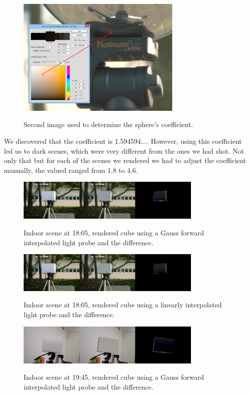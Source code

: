 \documentclass[conference]{acmsiggraph}
\begin{document}
	\begin{figure}[!ht]
		\centering
		\caption{Second image used to determine the sphere’s coefficient.}
		\includegraphics[width=8cm]{images/esf.png}
		\label{fig:esf}
	\end{figure}

	We discovered that the coefficient is 1.594594.... However, using this coefficient led us to dark scenes, which were very different from the ones we had shot. Not only that but for each of the scenes we rendered we had to adjust the coefficient manually, the valued ranged from 1.8 to 4.6.


	\begin{figure}[!ht]
		\caption{Indoor scene at 18:05, rendered cube using a Gauss forward interpolated light probe and the difference.}
		\centering
		\includegraphics[width=9cm]{images/extcubo1for.png}
		\label{fig:extcubo1for}
	\end{figure}

	\begin{figure}[!ht]
		\caption{Indoor scene at 18:05, rendered cube using a linearly interpolated light probe and the difference.}
		\centering
		\includegraphics[width=9cm]{images/extcubo1lin.png}
		\label{fig:extcubo1lin}
	\end{figure}

	\begin{figure}[!ht]
		\caption{Indoor scene at 19:45, rendered cube using a Gauss forward interpolated light probe and the difference.}
		\centering
		\includegraphics[width=9cm]{images/intcubo1for.png}
		\label{fig:intcubo1for}
	\end{figure}
\end{document}
